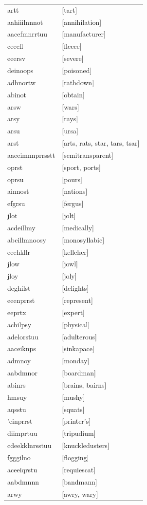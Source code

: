 \documentclass{article}
\begin{document}
\begin{tabular}{ll}
artt & [tart] \\
aahiiilnnnot & [annihilation] \\
aacefmnrrtuu & [manufacturer] \\
ceeefl & [fleece] \\
eeersv & [severe] \\
deinoops & [poisoned] \\
adhnortw & [rathdown] \\
abinot & [obtain] \\
arsw & [wars] \\
arsy & [rays] \\
arsu & [ursa] \\
arst & [arts, rats, star, tars, tsar] \\
aaeeimnnprrsstt & [semitransparent] \\
oprst & [sport, ports] \\
oprsu & [pours] \\
ainnost & [nations] \\
efgrsu & [fergus] \\
jlot & [jolt] \\
acdeillmy & [medically] \\
abcillmnoosy & [monosyllabic] \\
eeehkllr & [kelleher] \\
jlow & [jowl] \\
jloy & [joly] \\
deghilst & [delights] \\
eeenprrst & [represent] \\
eeprtx & [expert] \\
achilpsy & [physical] \\
adelorstuu & [adulterous] \\
aaceiknps & [sinkapace] \\
admnoy & [monday] \\
aabdmnor & [boardman] \\
abinrs & [brains, bairns] \\
hmsuy & [mushy] \\
aqsstu & [squats] \\
'einprrst & [printer's] \\
diimprtuu & [tripudium] \\
cdeekklnrsstuu & [knuckledusters] \\
fgggilno & [flogging] \\
aceeiqrstu & [requiescat] \\
aabdmnnn & [bandmann] \\
arwy & [awry, wary] \\

\end{tabular}
\end{document}
